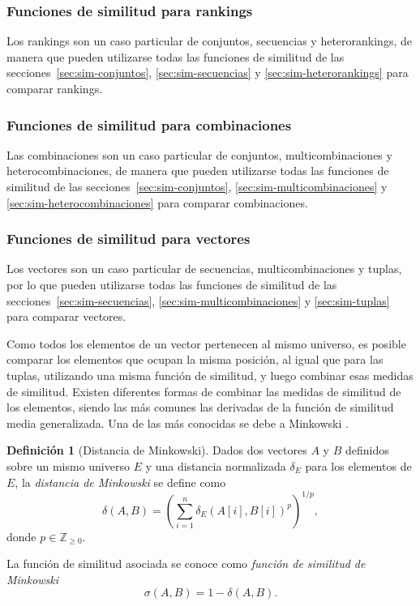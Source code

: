\documentclass[a4paper,10pt,twoside]{article}
\theoremstyle{definition}
\newtheorem{definition}{Definición}
\begin{document}
\subsubsection{Funciones de similitud para rankings}
\label{sec:sim-rankings}
Los rankings son un caso particular de conjuntos, secuencias y heterorankings, de manera que pueden utilizarse todas las funciones de similitud de las secciones~\ref{sec:sim-conjuntos}, \ref{sec:sim-secuencias} y \ref{sec:sim-heterorankings} para comparar rankings.


\subsubsection{Funciones de similitud para combinaciones}
\label{sec:sim-combinaciones}
Las combinaciones son un caso particular de conjuntos,
multicombinaciones y  heterocombinaciones, de manera que pueden utilizarse todas las funciones de similitud de las secciones~\ref{sec:sim-conjuntos}, \ref{sec:sim-multicombinaciones} y \ref{sec:sim-heterocombinaciones} para comparar combinaciones.


\subsubsection{Funciones de similitud para vectores}
\label{sec:sim-vectores}
Los vectores son un caso particular de secuencias, multicombinaciones y
tuplas, por lo que pueden utilizarse todas las funciones de similitud de las secciones~\ref{sec:sim-secuencias}, \ref{sec:sim-multicombinaciones} y \ref{sec:sim-tuplas} para comparar vectores.

Como todos los elementos de un vector pertenecen al mismo universo, es posible comparar los elementos que ocupan la misma
posición, al igual que para las tuplas, utilizando una misma función de similitud, y luego combinar esas medidas de similitud. 
Existen diferentes formas de combinar las medidas de similitud de los elementos, siendo las más comunes las derivadas de la
función de similitud media generalizada. 
Una de las más conocidas se debe a Minkowski \cite{xu2008clustering}.

\begin{definition}[Distancia de Minkowski]
Dados dos vectores $A$ y $B$ definidos sobre un mismo universo $E$ y una distancia normalizada $\delta_E$ para los elementos de $E$, la \emph{distancia de Minkowski} se define como
\[
\delta(A,B)=\left(\sum_{i=1}^{n}\delta_E(A[i],B[i])^p\right)^{1/p},
\]
donde $p\in \mathbb{Z}_{\geq 0}$.

La función de similitud asociada se conoce como \emph{función de similitud de Minkowski}
\[
\sigma(A,B)=1-\delta(A,B).
\]
\end{definition}
\end{document}
